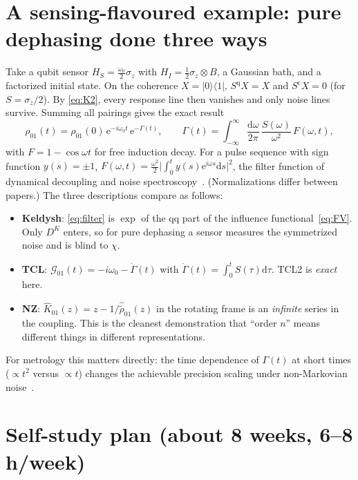 \documentclass[11pt]{article}
\newcommand{\Gc}{\mathcal{G}}
\newcommand{\ee}{\mathrm{e}}
\newcommand{\dd}{\mathrm{d}}
\newcommand{\cl}{\mathrm{c}}
\newcommand{\qu}{\mathrm{q}}
\newcommand{\ket}[1]{|#1\rangle}
\newcommand{\bra}[1]{\langle#1|}
\begin{document}
\section{A sensing-flavoured example: pure dephasing done three ways}
\label{sec:sensing}

Take a qubit sensor $H_S=\frac{\omega_0}{2}\sigma_z$ with $H_I=\frac12\sigma_z\otimes B$, a Gaussian bath,
and a factorized initial state. On the coherence $X=\ket0\bra1$,
$S^\qu X=X$ and $S^\cl X=0$ (for $S=\sigma_z/2$). By \cref{eq:K2}, every response line then
vanishes and only noise lines survive. Summing all pairings gives the exact result
\begin{equation}
  \rho_{01}(t)=\rho_{01}(0)\,\ee^{-i\omega_0t}\,\ee^{-\Gamma(t)},\qquad
  \Gamma(t)=\int_{-\infty}^{\infty}\!\frac{\dd\omega}{2\pi}\,\frac{S(\omega)}{\omega^2}\,F(\omega,t),
  \label{eq:filter}
\end{equation}
with $F=1-\cos\omega t$ for free induction decay. For a pulse sequence with sign function
$y(s)=\pm1$, $F(\omega,t)=\frac{\omega^2}{2}\big|\int_0^t y(s)\ee^{i\omega s}\dd s\big|^2$, the filter function of
dynamical decoupling and noise spectroscopy~\cite{Cywinski2008,Degen2017}. (Normalizations
differ between papers.) The three descriptions compare as follows:
\begin{itemize}\itemsep0pt
\item \textbf{Keldysh}: \cref{eq:filter} is $\exp$ of the $\qu\qu$ part of the influence
  functional~\eqref{eq:FV}. Only $D^K$ enters, so for pure dephasing a sensor measures the
  symmetrized noise and is blind to $\chi$.
\item \textbf{TCL}: $\Gc_{01}(t)=-i\omega_0-\dot\Gamma(t)$ with $\dot\Gamma(t)=\int_0^t S(\tau)\dd\tau$. TCL2 is
  \emph{exact} here.
\item \textbf{NZ}: $\hat K_{01}(z)=z-1/\hat{\tilde\rho}_{01}(z)$ in the rotating frame is an \emph{infinite}
  series in the coupling. This is the cleanest demonstration that ``order $n$'' means
  different things in different representations.
\end{itemize}
For metrology this matters directly: the time dependence of $\Gamma(t)$ at short times
($\propto t^2$ versus $\propto t$) changes the achievable precision scaling under
non-Markovian noise~\cite{Chin2012}.

\section{Self-study plan (about 8 weeks, 6--8 h/week)}
\label{sec:plan}
\end{document}
